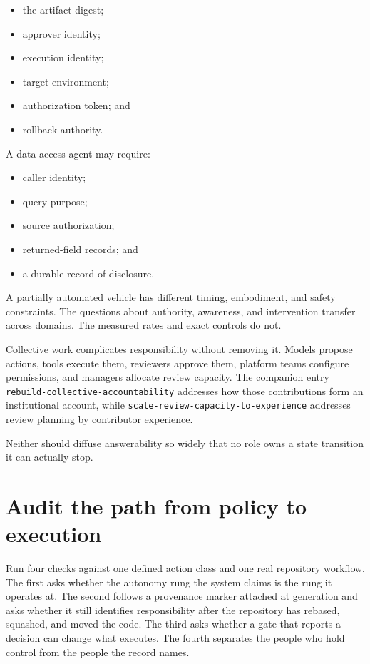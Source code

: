 \begin{itemize}
\tightlist
\item
  the artifact digest;
\item
  approver identity;
\item
  execution identity;
\item
  target environment;
\item
  authorization token; and
\item
  rollback authority.
\end{itemize}


A data-access agent may require:

\begin{itemize}
\tightlist
\item
  caller identity;
\item
  query purpose;
\item
  source authorization;
\item
  returned-field records; and
\item
  a durable record of disclosure.
\end{itemize}

A partially automated vehicle has different timing, embodiment, and safety constraints. The questions about authority, awareness, and intervention transfer across domains. The measured rates and exact controls do not.

Collective work complicates responsibility without removing it. Models propose actions, tools execute them, reviewers approve them, platform teams configure permissions, and managers allocate review capacity. The companion entry \texttt{rebuild-collective-accountability} addresses how those contributions form an institutional account, while \texttt{scale-review-capacity-to-experience} addresses review planning by contributor experience.

Neither should diffuse answerability so widely that no role owns a state transition it can actually stop.

\hypertarget{audit-the-path-from-policy-to-execution}{%
\section{Audit the path from policy to execution}\label{audit-the-path-from-policy-to-execution}}

Run four checks against one defined action class and one real repository workflow. The first asks whether the autonomy rung the system claims is the rung it operates at. The second follows a provenance marker attached at generation and asks whether it still identifies responsibility after the repository has rebased, squashed, and moved the code. The third asks whether a gate that reports a decision can change what executes. The fourth separates the people who hold control from the people the record names.

